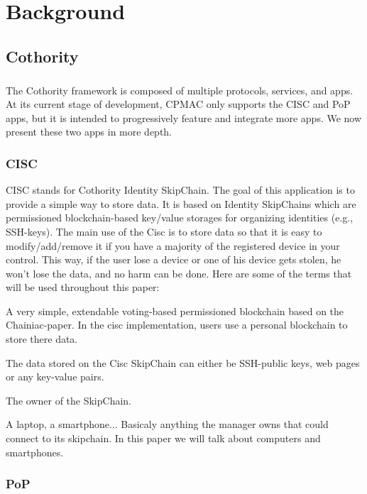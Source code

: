\chapter{Background}
\section{Cothority}

\paragraph{}
The Cothority framework is composed of multiple protocols, services, and apps. At its current stage of development, CPMAC only supports the CISC and PoP apps, but it is intended to progressively feature and integrate more apps. We now present these two apps in more depth.

\subsection{CISC}

CISC stands for Cothority Identity SkipChain. The goal of this application is to provide a simple way to store data. It is based on Identity SkipChains which are permissioned blockchain-based key/value storages for organizing identities (e.g., SSH-keys). The main use of the Cisc is to store data so that it is easy to modify/add/remove it if you have a majority of the registered device in your control. This way, if the user lose a device or one of his device gets stolen, he won't lose the data, and no harm can be done. Here are some of the terms that will be used throughout this paper:
\begin{description}[style=nextline]
\item[SkipChain] A very simple, extendable voting-based permissioned blockchain based on the Chainiac-paper. In the cisc implementation, users use a personal blockchain to store there data.
\item[Data] The data stored on the Cisc SkipChain can either be SSH-public keys, web pages or any key-value pairs.
\item[Manager] The owner of the SkipChain.
\item[Device] A laptop, a smartphone... Basicaly anything the manager owns that could connect to its skipchain. In this paper we will talk about computers and smartphones.
\end{description}

\subsection{PoP}

